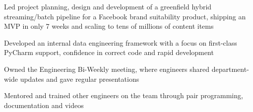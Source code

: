 \begin{job}

  \begin{accomplishments}
    \item Led project planning, design and development of a greenfield hybrid
    streaming/batch pipeline for a Facebook brand suitability product,
    shipping an MVP in only 7 weeks and scaling to tens of millions of content
    items
    \item Developed an internal data engineering framework with a focus on
    first-class PyCharm support, confidence in correct code and
    rapid development
  \end{accomplishments}

  \begin{extendedaccomplishments}
    \item Owned the Engineering Bi-Weekly meeting, where engineers shared
    department-wide updates and gave regular presentations
    \item Mentored and trained other engineers on the team through pair
    programming, documentation and videos
  \end{extendedaccomplishments}
\end{job}
